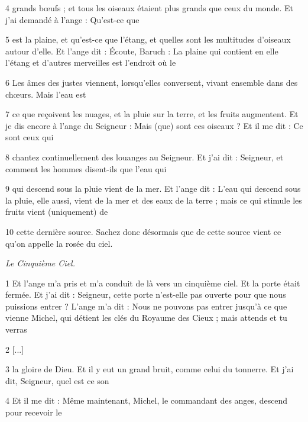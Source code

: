 \par 4 grands bœufs ; et tous les oiseaux étaient plus grands que ceux du monde. Et j'ai demandé à l'ange : Qu'est-ce que

\par 5 est la plaine, et qu'est-ce que l'étang, et quelles sont les multitudes d'oiseaux autour d'elle. Et l'ange dit : Écoute, Baruch : La plaine qui contient en elle l'étang et d'autres merveilles est l'endroit où le

\par 6 Les âmes des justes viennent, lorsqu'elles conversent, vivant ensemble dans des chœurs. Mais l'eau est

\par 7 ce que reçoivent les nuages, et la pluie sur la terre, et les fruits augmentent. Et je dis encore à l'ange du Seigneur : Mais (que) sont ces oiseaux ? Et il me dit : Ce sont ceux qui

\par 8 chantez continuellement des louanges au Seigneur. Et j'ai dit : Seigneur, et comment les hommes disent-ils que l'eau qui

\par 9 qui descend sous la pluie vient de la mer. Et l'ange dit : L'eau qui descend sous la pluie, elle aussi, vient de la mer et des eaux de la terre ; mais ce qui stimule les fruits vient (uniquement) de

\par 10 cette dernière source. Sachez donc désormais que de cette source vient ce qu'on appelle la rosée du ciel.


\par \textit{Le Cinquième Ciel.}

\par 1 Et l'ange m'a pris et m'a conduit de là vers un cinquième ciel. Et la porte était fermée. Et j'ai dit : Seigneur, cette porte n'est-elle pas ouverte pour que nous puissions entrer ? L'ange m'a dit : Nous ne pouvons pas entrer jusqu'à ce que vienne Michel, qui détient les clés du Royaume des Cieux ; mais attends et tu verras

\par 2 [...]

\par 3 la gloire de Dieu. Et il y eut un grand bruit, comme celui du tonnerre. Et j'ai dit, Seigneur, quel est ce son

\par 4 Et il me dit : Même maintenant, Michel, le commandant des anges, descend pour recevoir le


